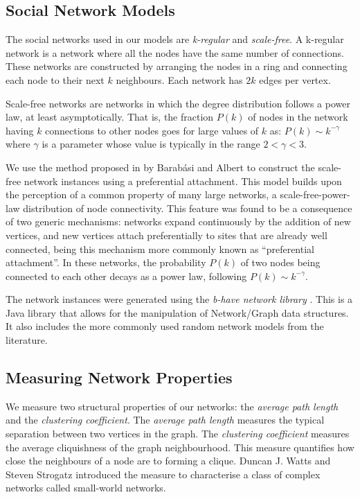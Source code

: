 \documentclass[preprint,number]{elsarticle}
\begin{document}
\subsection{Social Network Models}
\label{sec:exp-setup_network_models}
The social networks used in our models are \textit{k-regular} and \textit{scale-free}. A k-regular network is a network where all the nodes have the same number of connections. These networks are constructed by arranging the nodes in a ring and connecting each node to their next $k$ neighbours. Each network has $2k$ edges per vertex. 

Scale-free networks are networks in which the degree distribution follows a power law, at least asymptotically. That is, the fraction $P(k)$ of nodes in the network having $k$ connections to other nodes goes for large values of $k$ as: $ P(k)  \sim  k^{-\gamma}$ where $\gamma$ is a parameter whose value is typically in the range $2 < \gamma < 3$.

We use the method proposed in \cite{Barabasi1999} by Barab\'{a}si and Albert to construct the scale-free network instances using a preferential attachment. This model builds upon the perception of a common property of many large networks, a scale-free-power-law distribution of node connectivity. This feature was found to be a consequence of two generic mechanisms: networks expand continuously by the addition of new vertices, and new vertices attach preferentially to sites that are already well connected, being this mechanism more commonly known as ``preferential attachment''. In these networks, the probability $P(k)$ of two nodes being connected to each other decays as a power law, following $P(k) \sim k^{- \gamma}$.

The network instances were generated using the \textit{b-have network library} \cite{Nunes:Software:11069}. This is a Java library that allows for the manipulation of Network/Graph data structures. It also includes the more commonly used random network models from the literature. 

\subsection{Measuring Network Properties}
We measure two structural properties of our networks: the \textit{average path length} and the \textit{clustering coefficient}. The \textit{average path length} measures the typical separation between two vertices in the graph. The \textit{clustering coefficient} measures the average cliquishness of the graph neighbourhood. This measure quantifies how close the neighbours of a node are to forming a clique. Duncan J. Watts and Steven Strogatz \cite{Watts1998} introduced the measure to characterise a class of complex networks called small-world networks. 
\end{document}
